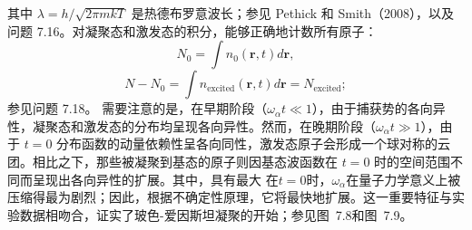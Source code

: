 其中 \(\lambda = h/\sqrt{2\pi mkT}\) 是热德布罗意波长；参见 Pethick 和 Smith（2008），以及问题 7.16。对凝聚态和激发态的积分，能够正确地计数所有原子：
\begin{equation}\tag{7.2.7}\label{eq:7.2.7}
N _ { 0 } = \int n _ { 0 } ( \boldsymbol { r } , t ) d \boldsymbol { r } ,
\end{equation}
\begin{equation}\tag{7.2.8}\label{eq:7.2.8}
N - N _ { 0 } = \int n _ { \mathrm { e x c i t e d } } ( \pmb { r } , t ) d \pmb { r } = N _ { \mathrm { e x c i t e d } } ;
\end{equation}
参见问题 7.18。
需要注意的是，在早期阶段（\(\omega_{\alpha}t \ll 1\)），由于捕获势的各向异性，凝聚态和激发态的分布均呈现各向异性。然而，在晚期阶段（\(\omega_{\alpha}t \gg 1\)），由于 \(t=0\) 分布函数的动量依赖性呈各向同性，激发态原子会形成一个球对称的云团。相比之下，那些被凝聚到基态的原子则因基态波函数在 \(t=0\) 时的空间范围不同而呈现出各向异性的扩展。其中，具有最大
在\(t=0\)时，\(\omega_{\alpha}\)在量子力学意义上被压缩得最为剧烈；因此，根据不确定性原理，它将最快地扩展。这一重要特征与实验数据相吻合，证实了玻色-爱因斯坦凝聚的开始；参见图~7.8和图~7.9。
